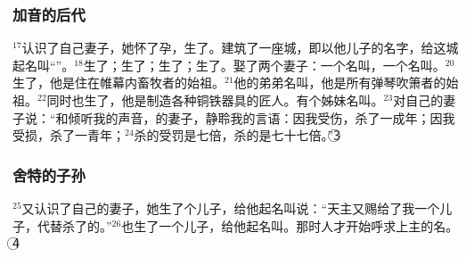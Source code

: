 \subsubsection{加音的后代} $^{17}$\UL[加音]认识了自己妻子，她怀了孕，生了\UL[哈诺客]。\UL[加音]建筑了一座城，即以他儿子的名字，给这城起名叫“\UL[哈诺客]”。$^{18}$\UL[哈诺客]生了\UL[依辣得]；\UL[依辣得]生了\UL[默胡雅耳]；\UL[默胡雅耳]生了\UL[默突沙耳]；\UL[默突沙耳]生了\UL[拉默客]。\UL[拉默客]娶了两个妻子：一个名叫\UL[阿达]，一个名叫\UL[漆拉]。$^{20}$\UL[阿达]生了\UL[雅巴尔]，他是住在帷幕内畜牧者的始祖。$^{21}$他的弟弟名叫\UL[犹巴耳]，他是所有弹琴吹箫者的始祖。$^{22}$同时\UL[漆拉]也生了\UL[突巴耳加音]，他是制造各种铜铁器具的匠人。\UL[突巴耳加音]有个姊妹名叫\UL[纳阿玛]。$^{23}$\UL[拉默客]对自己的妻子说：“\UL[阿达]和\UL[漆拉]倾听我的声音，\UL[拉默客]的妻子，静聆我的言语：因我受伤，杀了一成年；因我受损，杀了一青年；$^{24}$杀\UL[加音]的受罚是七倍，杀\UL[拉默客]的是七十七倍。”\textcircled{3}


\subsubsection{舍特的子孙}
$^{25}$\UL[亚当]又认识了自己的妻子，她生了个儿子，给他起名叫\UL[舍特]说：“天主又赐给了我一个儿子，代替\UL[加音]杀了的\UL[亚伯尔]。”$^{26}$\UL[舍特]也生了一个儿子，给他起名叫\UL[厄诺士]。那时人才开始呼求上主的名。\textcircled{4}


